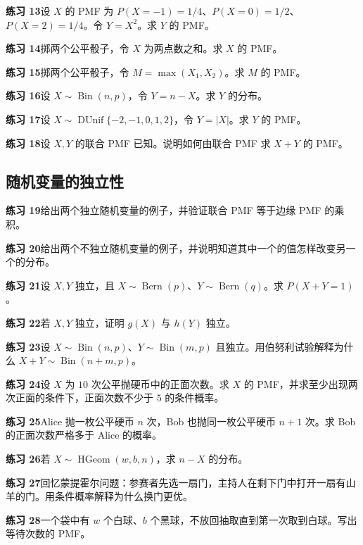 \documentclass[UTF8, 12pt, fontset=fandol, oneside]{ctexart}
\begin{document}
\noindent\textbf{练习 13}\quad 设 $X$ 的 PMF 为 $P(X=-1)=1/4$、$P(X=0)=1/2$、$P(X=2)=1/4$。令 $Y=X^2$。求 $Y$ 的 PMF。

\noindent\textbf{练习 14}\quad 掷两个公平骰子，令 $X$ 为两点数之和。求 $X$ 的 PMF。

\noindent\textbf{练习 15}\quad 掷两个公平骰子，令 $M=\max(X_1,X_2)$。求 $M$ 的 PMF。

\noindent\textbf{练习 16}\quad 设 $X\sim\operatorname{Bin}(n,p)$，令 $Y=n-X$。求 $Y$ 的分布。

\noindent\textbf{练习 17}\quad 设 $X\sim\operatorname{DUnif}\{-2,-1,0,1,2\}$，令 $Y=|X|$。求 $Y$ 的 PMF。

\noindent\textbf{练习 18}\quad 设 $X,Y$ 的联合 PMF 已知。说明如何由联合 PMF 求 $X+Y$ 的 PMF。

\subsection*{随机变量的独立性}

\noindent\textbf{练习 19}\quad 给出两个独立随机变量的例子，并验证联合 PMF 等于边缘 PMF 的乘积。

\noindent\textbf{练习 20}\quad 给出两个不独立随机变量的例子，并说明知道其中一个的值怎样改变另一个的分布。

\noindent\textbf{练习 21}\quad 设 $X,Y$ 独立，且 $X\sim\operatorname{Bern}(p)$、$Y\sim\operatorname{Bern}(q)$。求 $P(X+Y=1)$。

\noindent\textbf{练习 22}\quad 若 $X,Y$ 独立，证明 $g(X)$ 与 $h(Y)$ 独立。

\noindent\textbf{练习 23}\quad 设 $X\sim\operatorname{Bin}(n,p)$、$Y\sim\operatorname{Bin}(m,p)$ 且独立。用伯努利试验解释为什么 $X+Y\sim\operatorname{Bin}(n+m,p)$。

\noindent\textbf{练习 24}\quad 设 $X$ 为 $10$ 次公平抛硬币中的正面次数。求 $X$ 的 PMF，并求至少出现两次正面的条件下，正面次数不少于 $5$ 的条件概率。

\noindent\textbf{练习 25}\quad Alice 抛一枚公平硬币 $n$ 次，Bob 也抛同一枚公平硬币 $n+1$ 次。求 Bob 的正面次数严格多于 Alice 的概率。

\noindent\textbf{练习 26}\quad 若 $X\sim\operatorname{HGeom}(w,b,n)$，求 $n-X$ 的分布。

\noindent\textbf{练习 27}\quad 回忆蒙提霍尔问题：参赛者先选一扇门，主持人在剩下门中打开一扇有山羊的门。用条件概率解释为什么换门更优。

\noindent\textbf{练习 28}\quad 一个袋中有 $w$ 个白球、$b$ 个黑球，不放回抽取直到第一次取到白球。写出等待次数的 PMF。
\end{document}
